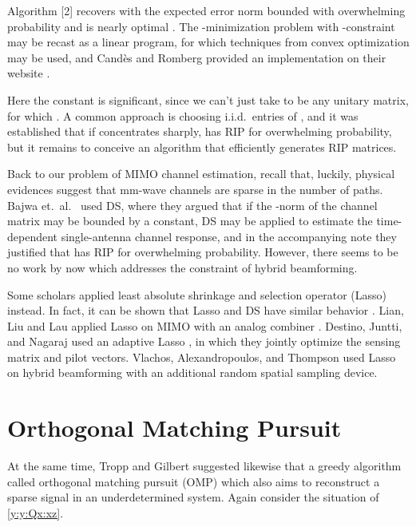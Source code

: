 Algorithm [2] recovers  with the expected error norm bounded with overwhelming probability and is nearly optimal \cite {CaT07}.
The -minimization problem with \m {\ell_\infty}-constraint may be recast as a linear program, for which techniques from convex optimization may be used, and Candès and Romberg provided an implementation on their website \cite {CaR05}.

Here the constant  is significant, since we can't just take  to be any unitary matrix, for which .
A common approach is choosing i.i.d.\ entries of , and it was established \cite {BDD08} that if  concentrates sharply,  has RIP for overwhelming probability, but it remains to conceive an algorithm that efficiently generates RIP matrices.

Back to our problem of MIMO channel estimation, recall that, luckily, physical evidences suggest that mm-wave channels are sparse in the number of paths.
Bajwa et.\ al.\ \cite {BHS10} used DS, where they argued that if the -norm of the channel matrix may be bounded by a constant, DS may be applied to estimate the time-dependent single-antenna channel response,
and in the accompanying note \cite {BHR08} they justified that  has RIP for overwhelming probability.
However, there seems to be no work by now which addresses the constraint of hybrid beamforming.

Some scholars applied least absolute shrinkage and selection operator (Lasso) instead.
In fact, it can be shown that Lasso and DS have similar behavior \cite {AsR10}.
Lian, Liu and Lau applied Lasso on MIMO with an analog combiner \cite {LLL17}.
Destino, Juntti, and Nagaraj used an adaptive Lasso \cite {DJN15}, in which they jointly optimize the sensing matrix and pilot vectors.
Vlachos, Alexandropoulos, and Thompson \cite {VAT19} used Lasso on hybrid beamforming with an additional random spatial sampling device.

\section {Orthogonal Matching Pursuit}

At the same time, Tropp and Gilbert \cite {TrG07b} suggested likewise that a greedy algorithm called orthogonal matching pursuit (OMP) which also aims to reconstruct a sparse signal in an underdetermined system.
Again consider the situation of \eqref {y:y:Qx:xz}.

